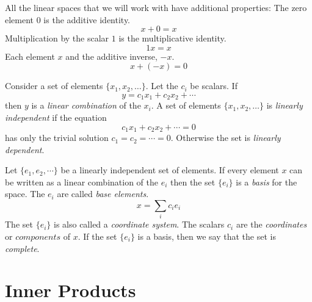 All the linear spaces that we will work with have additional properties:
The zero element $0$ is the additive identity.
\[
x + 0 = x
\]
Multiplication by the scalar $1$ is the multiplicative identity.
\[
1 x = x
\]
Each element $x$ and the additive inverse, $-x$.
\[
x + (-x) = 0
\]


Consider a set of elements $\{x_1, x_2, \ldots\}$.  Let the $c_i$ be scalars.
If 
\[
y = c_1 x_1 + c_2 x_2 + \cdots
\]
then $y$ is a \textit{linear combination} of the $x_i$.
A set of elements $\{x_1, x_2, \ldots\}$ is \textit{linearly independent} if 
the equation
\[
c_1 x_1 + c_2 x_2 + \cdots = 0
\]
has only the trivial solution $c_1 = c_2 = \cdots = 0$.  Otherwise the set
is \textit{linearly dependent}. 


Let $\{e_1, e_2, \cdots\}$ be a linearly independent set of elements.
If every element $x$ can be written as a linear combination of the $e_i$
then the set $\{ e_i \}$ is a \textit{basis} for the space.  
The $e_i$ are called \textit{base elements}.
\[
x = \sum_{i} c_i e_i
\]
The set $\{e_i\}$ is also called a \textit{coordinate system}.  The scalars
$c_i$ are the \textit{coordinates} or $\textit{components}$ of $x$.
If the set $\{e_i\}$ is a basis, then we say that the set is 
\textit{complete}.






















\section{Inner Products}



